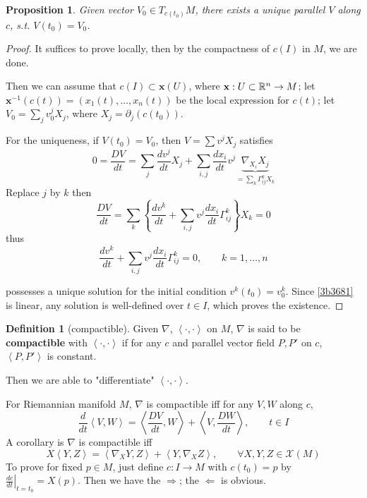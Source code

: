 \documentclass{amsart}
\let\originalmathbb\mathbb
\renewcommand{\mathbb}[1]{%
    \ifstrequal{#1}{1}{\mathbbm{#1}}{\originalmathbb{#1}}%
}
\theoremstyle{plain}
\newtheorem{proposition}[theorem]{Proposition}
\theoremstyle{definition}
\newtheorem{definition}[theorem]{Definition}
\theoremstyle{remark}
\begin{document}
\begin{proposition}
Given vector $V_{0}\in T_{c(t_0)}M$, there exists a unique parallel $V$ along $c$, s.t. $V(t_0)=V_0$.
\end{proposition}
\begin{proof}
It suffices to prove locally, then by the compactness of $c(I)$ in $M$, we are done.

Then we can assume that $c(I)\subset \mathbf{x}(U)$, where $\mathbf{x}:U\subset \mathbb{R}^{n}\to M$; let $\mathbf{x}^{-1}(c(t))=(x_1(t),\dots,x_n(t))$ be the local expression for $c(t)$; let $V_0=\sum _jv_0^{j}X_j$, where $X_j=\partial _j(c(t_0))$.

For the uniqueness, if $V(t_0)=V_0$, then $V=\sum v^{j}X_j$ satisfies
\[
0=\frac{DV}{dt }=\sum _j\frac{dv^{j}}{dt }X_j+\sum_{i,j}\frac{dx_i}{dt }v^{j}\underbrace{ \nabla_{X_i}X_j }_{ =\sum _k\Gamma^{k}_{ij} X_k}
\]
Replace $j$ by $k$ then
\[
\frac{DV}{dt }=\sum _k\left\{  \frac{dv^{k}}{dt }+\sum_{i,j} v^{j}\frac{dx_i}{dt }\Gamma^{k}_{ij} \right\}X_k=0
\]
thus
\begin{equation}
\frac{dv^{k}}{dt }+\sum_{i,j} v^{j}\frac{dx_i}{dt }\Gamma^{k}_{ij} =0,\qquad k=1,\dots,n
\label{3b3681}
\end{equation}

possesses a unique solution for the initial condition $v^{k}(t_0)=v_0^{k}$. Since \cref{3b3681} is linear, any solution is well-defined over $t\in I$, which proves the existence.

\end{proof}

\begin{definition}[compactible]
Given $\nabla$, $\left< \cdot,\cdot \right>$ on $M$, $\nabla$ is said to be \textbf{compactible} with $\left< \cdot,\cdot \right>$ if for any $c$ and parallel vector field $P,P'$ on $c$, $\left< P,P' \right>$ is constant.
\end{definition}
Then we are able to "differentiate" $\left< \cdot,\cdot \right>$.

For Riemannian manifold $M$, $\nabla$ is compactible iff for any $V,W$ along $c$,
\[
\frac{d}{dt }\left< V,W \right> = \left< \frac{DV}{dt },W \right> +\left< V,\frac{DW}{dt } \right>, \qquad t\in I
\]
A corollary is $\nabla$ is compactible iff
\[
X\left< Y,Z \right> = \left< \nabla_{X}Y,Z \right> +\left< Y,\nabla_{X}Z \right> ,\qquad \forall X,Y,Z\in \mathcal{X}(M)
\]
To prove for fixed $p\in M$, just define $c:I\to M$ with $c(t_0)=p$ by $\left.\frac{dc}{dt }\right|_{t=t_0}=X(p)$. Then we have the $\Rightarrow$; the $\Leftarrow$ is obvious.
\end{document}

